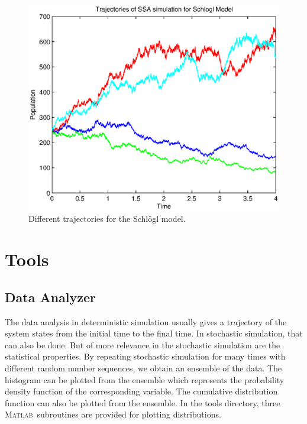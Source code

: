 \documentclass[12pt]{article}
\newcommand{\matlab}{\textsc{Matlab}}
\begin{document}
\begin{figure}[htbp]
  \centering \includegraphics{schlogl_trajectory.eps}
  \caption{Different trajectories for the Schl\"ogl model.}
  \label{schlogl_trajectory}
\end{figure}

\section{Tools}
\subsection{Data Analyzer} \label{dataanalyzer}
The data analysis in deterministic simulation usually gives a trajectory of
the system states from the initial time to the final time. In stochastic
simulation, that can also be done. But of more relevance in the stochastic
simulation are the statistical properties. By repeating stochastic simulation
for many times with different random number sequences, we obtain an ensemble of the
data. The histogram can be plotted from the ensemble which represents the probability
density function of the corresponding variable. The cumulative distribution function
can also be plotted from the ensemble. In the tools directory, three \matlab\
subroutines are provided for plotting distributions.
\end{document}
